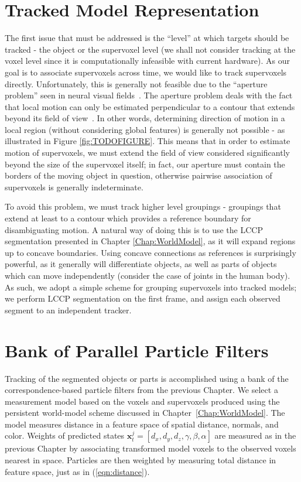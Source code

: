 
\section{Tracked Model Representation}
The first issue that must be addressed is the ``level'' at which targets should be tracked - the object or the supervoxel level (we shall not consider tracking at the voxel level since it is computationally infeasible with current hardware). As our goal is to associate supervoxels across time, we would like to track supervoxels directly. Unfortunately, this is generally not feasible due to the ``aperture problem'' seen in neural visual fields~\cite{MarrApertureProblem}. The aperture problem deals with the fact that local motion can only be estimated perpendicular to a contour that extends beyond its field of view~\cite{shimojo1989}. In other words, determining direction of motion in a local region (without considering global features) is generally not possible - as illustrated in Figure \ref{fig:TODOFIGURE}. This means that in order to estimate motion of supervoxels, we must extend the field of view considered significantly beyond the size of the supervoxel itself; in fact, our aperture must contain the borders of the moving object in question, otherwise pairwise association of supervoxels is generally indeterminate. 


To avoid this problem, we must track higher level groupings - groupings that extend at least to a contour which provides a reference boundary for disambiguating motion. A natural way of doing this is to use the LCCP segmentation presented in Chapter \ref{Chap:WorldModel}, as it will expand regions up to concave boundaries. Using concave connections as references is surprisingly powerful, as it generally will differentiate objects, as well as parts of objects which can move independently (consider the case of joints in the human body). As such, we adopt a simple scheme for grouping supervoxels into tracked models; we perform LCCP segmentation on the first frame, and assign each observed segment to an independent tracker.

\section{Bank of Parallel Particle Filters}
Tracking of the segmented objects or parts is accomplished using a bank of the correspondence-based particle filters from the previous Chapter. We select a measurement model based on the voxels and supervoxels produced using the persistent world-model scheme discussed in Chapter~\ref{Chap:WorldModel}. The model measures distance in a feature space of spatial distance, normals, and color. Weights of predicted states $\mathbf{x}^j_t = [d_x, d_y, d_z, \gamma, \beta, \alpha]$ are measured as in the previous Chapter by associating transformed model voxels to the observed voxels nearest in space. Particles are then weighted by measuring total distance in feature space, just as in (\ref{eqn:distance}).

